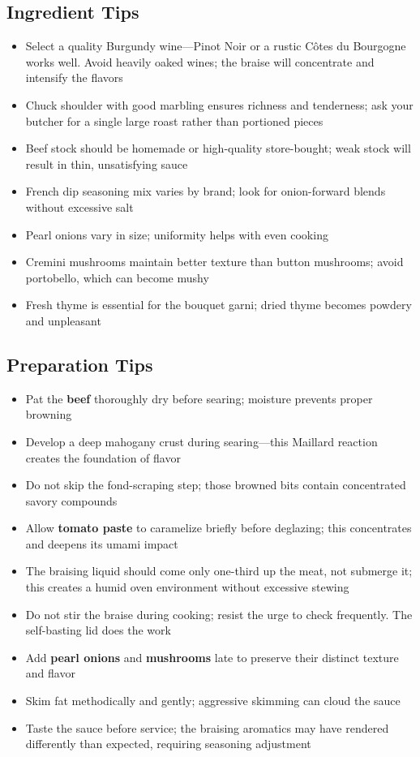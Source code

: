 \documentclass[11pt,letterpaper]{article}
\begin{document}
{\begin{multicols}{2}
\subsection*{Ingredient Tips}
\begin{itemize}
    \item Select a quality Burgundy wine---Pinot Noir or a rustic Côtes du Bourgogne works well. Avoid heavily oaked wines; the braise will concentrate and intensify the flavors
    \item Chuck shoulder with good marbling ensures richness and tenderness; ask your butcher for a single large roast rather than portioned pieces
    \item Beef stock should be homemade or high-quality store-bought; weak stock will result in thin, unsatisfying sauce
    \item French dip seasoning mix varies by brand; look for onion-forward blends without excessive salt
    \item Pearl onions vary in size; uniformity helps with even cooking
    \item Cremini mushrooms maintain better texture than button mushrooms; avoid portobello, which can become mushy
    \item Fresh thyme is essential for the bouquet garni; dried thyme becomes powdery and unpleasant
\end{itemize}

\subsection*{Preparation Tips}
\begin{itemize}
    \item Pat the \textbf{beef} thoroughly dry before searing; moisture prevents proper browning
    \item Develop a deep mahogany crust during searing---this Maillard reaction creates the foundation of flavor
    \item Do not skip the fond-scraping step; those browned bits contain concentrated savory compounds
    \item Allow \textbf{tomato paste} to caramelize briefly before deglazing; this concentrates and deepens its umami impact
    \item The braising liquid should come only one-third up the meat, not submerge it; this creates a humid oven environment without excessive stewing
    \item Do not stir the braise during cooking; resist the urge to check frequently. The self-basting lid does the work
    \item Add \textbf{pearl onions} and \textbf{mushrooms} late to preserve their distinct texture and flavor
    \item Skim fat methodically and gently; aggressive skimming can cloud the sauce
    \item Taste the sauce before service; the braising aromatics may have rendered differently than expected, requiring seasoning adjustment
\end{itemize}


\end{multicols}}
\end{document}
